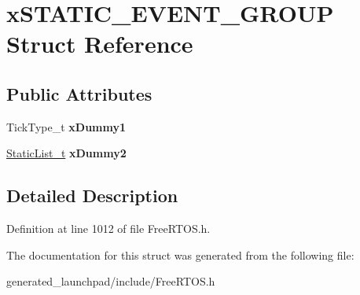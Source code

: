 \hypertarget{structxSTATIC__EVENT__GROUP}{}\section{x\+S\+T\+A\+T\+I\+C\+\_\+\+E\+V\+E\+N\+T\+\_\+\+G\+R\+O\+UP Struct Reference}
\label{structxSTATIC__EVENT__GROUP}
\subsection*{Public Attributes}
\begin{DoxyCompactItemize}
\item 
\mbox{\label{structxSTATIC__EVENT__GROUP_a4ed0094f715dd8f79a354f42fd973fc6}} 
Tick\+Type\+\_\+t {\bfseries x\+Dummy1}
\item 
\mbox{\label{structxSTATIC__EVENT__GROUP_a17d070c972ecd0151d7505a539653551}} 
\mbox{\hyperlink{structxSTATIC__LIST}{Static\+List\+\_\+t}} {\bfseries x\+Dummy2}
\end{DoxyCompactItemize}


\subsection{Detailed Description}


Definition at line 1012 of file Free\+R\+T\+O\+S.\+h.



The documentation for this struct was generated from the following file\+:\begin{DoxyCompactItemize}
\item 
generated\+\_\+launchpad/include/Free\+R\+T\+O\+S.\+h\end{DoxyCompactItemize}
